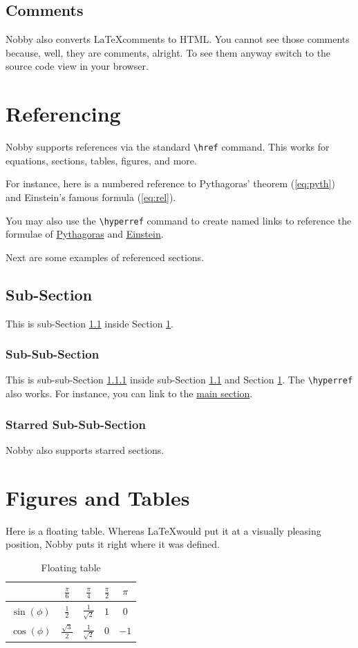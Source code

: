 \documentclass[10pt]{article}
\begin{document}
\subsection{Comments}
Nobby also converts \LaTeX comments to HTML. You cannot see those
comments because, well, they are comments, alright. To see them anyway
switch to the source code view in your browser.

\section{Referencing}
\label{sec:ref}
Nobby supports references via the standard \texttt{\textbackslash{href}}
command. This works for equations, sections, tables, figures, and
more.

For instance, here is a numbered reference to Pythagoras' theorem
(\ref{eq:pyth}) and Einstein's famous formula (\ref{eq:rel}).

You may also use the \texttt{\textbackslash{hyperref}} command to
create named links to reference the formulae of
\hyperref[eq:pyth]{Pythagoras} and \hyperref[eq:rel]{Einstein}.

Next are some examples of referenced sections.

\subsection{Sub-Section}
\label{ss:1}
This is sub-Section \ref{ss:1} inside Section \ref{sec:ref}.

\subsubsection{Sub-Sub-Section}
\label{sss:1}
This is sub-sub-Section \ref{sss:1} inside sub-Section \ref{ss:1} and
Section \ref{sec:ref}. The \texttt{\textbackslash{hyperref}} also
works. For instance, you can link to the \hyperref[sec:ref]{main section}.

\subsubsection*{Starred Sub-Sub-Section}
Nobby also supports starred sections.

\section{Figures and Tables}
Here is a floating table. Whereas  \LaTeX would put it at a visually
pleasing position, Nobby puts it right where it was defined.
\begin{table}
  \centering
  \begin{tabular}{c | c c c c}
    & $\frac{\pi}{6}$& $\frac{\pi}{4}$& $\frac{\pi}{2}$ & $\pi$\\[1mm]
    \hline
    \rule{0cm}{4mm}$\sin(\phi)$& $\frac{1}{2}$ & $\frac{1}{\sqrt{2}}$& $1$ & $0$\\
    \rule{0cm}{4mm}$\cos(\phi)$& $\frac{\sqrt{3}}{2}$ & $\frac{1}{\sqrt{2}}$& $0$&$-1$
  \end{tabular}
  \caption{Floating table}
\end{table}
\\
\end{document}
